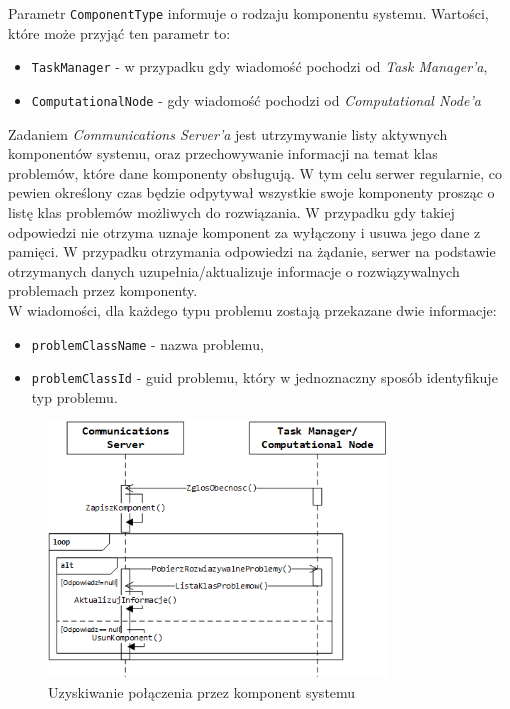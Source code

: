 \documentclass[12pt,a4paper,titlepage]{report}
\begin{document}
		  
		
	Parametr \verb+ComponentType+ informuje o rodzaju komponentu systemu. Wartości, które może przyjąć ten parametr to:
	\begin{itemize}
		\item \verb+TaskManager+ - w przypadku gdy wiadomość pochodzi od \textit{Task Manager'a},
		\item \verb+ComputationalNode+ - gdy wiadomość pochodzi od \textit{Computational Node'a}
	\end{itemize} 

	Zadaniem \textit{Communications Server'a} jest utrzymywanie listy aktywnych komponentów systemu, oraz przechowywanie informacji
	na temat klas problemów, które dane komponenty obsługują. W tym celu serwer regularnie, co pewien określony czas
	będzie odpytywał wszystkie swoje komponenty prosząc o listę klas problemów możliwych do rozwiązania. W przypadku gdy takiej
	odpowiedzi nie otrzyma uznaje komponent za wyłączony i usuwa jego dane z pamięci. W przypadku otrzymania odpowiedzi na
	żądanie, serwer na podstawie otrzymanych danych uzupełnia/aktualizuje informacje o rozwiązywalnych problemach
	przez komponenty.\\
	
		 

	W wiadomości, dla każdego typu problemu zostają przekazane dwie informacje:
	\begin{itemize}
		\item \verb+problemClassName+ - nazwa problemu,
		\item \verb+problemClassId+ - guid problemu, który w jednoznaczny sposób identyfikuje typ problemu.	
	\end{itemize} 		
		
	\begin{figure}[h]
		\centering
		\caption{Uzyskiwanie połączenia przez komponent systemu}
		\includegraphics[width=0.8\textwidth]{img/communication/connecting.png}
	\end{figure}
	
\end{document}
